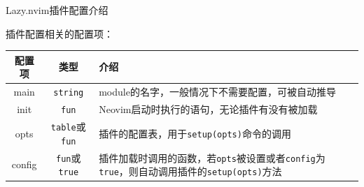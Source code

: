 \documentclass[aspectratio=169]{ctexbeamer}
\begin{document}
  \begin{frame}{Lazy.nvim插件配置介绍}

    插件配置相关的配置项：

    \begin{table}[H]
      \centering
      \small
      \begin{tabular}{ccp{8cm}}
        \toprule
        配置项    & 类型                                & 介绍                                                                                                     \\
        \midrule
        main   & \lstinline{string}                & module的名字，一般情况下不需要配置，可被自动推导                                                                            \\
        init   & \lstinline{fun}                   & Neovim启动时执行的语句，无论插件有没有被加载                                                                              \\
        opts   & \lstinline{table}或\lstinline{fun} & 插件的配置表，用于\lstinline{setup(opts)}命令的调用                                                                  \\ %
        config & \lstinline{fun}或\lstinline{true}  & 插件加载时调用的函数，若\lstinline{opts}被设置或者\lstinline{config}为\lstinline{true}，则自动调用插件的\lstinline{setup(opts)}方法 \\ %
        \bottomrule
      \end{tabular}
    \end{table}
  \end{frame}
\end{document}
